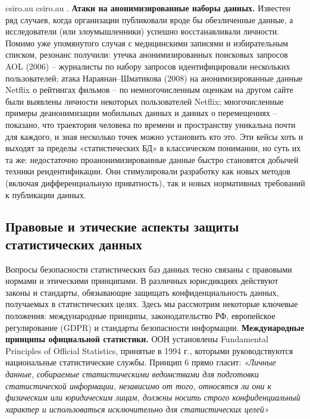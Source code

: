 csiro.au
csiro.au
. \textbf{Атаки на анонимизированные наборы данных.} Известен ряд случаев, когда организации публиковали вроде бы обезличенные данные, а исследователи (или злоумышленники) успешно восстанавливали личности. Помимо уже упомянутого случая с медицинскими записями и избирательным списком, резонанс получили: утечка анонимизированных поисковых запросов AOL (2006) – журналисты по набору запросов идентифицировали нескольких пользователей; атака Нараянан–Шматикова (2008) на анонимизированные данные Netflix о рейтингах фильмов – по немногочисленным оценкам на другом сайте были выявлены личности некоторых пользователей Netflix; многочисленные примеры деанонимизации мобильных данных и данных о перемещениях – показано, что траектория человека по времени и пространству уникальна почти для каждого, и зная несколько точек можно установить кто это. Эти кейсы хоть и выходят за пределы «статистических БД» в классическом понимании, но суть их та же: недостаточно проанонимизированные данные быстро становятся добычей техники реидентификации. Они стимулировали разработку как новых методов (включая дифференциальную приватность), так и новых нормативных требований к публикации данных. \subsection{Правовые и этические аспекты защиты статистических данных}
Вопросы безопасности статистических баз данных тесно связаны с правовыми нормами и этическими принципами. В различных юрисдикциях действуют законы и стандарты, обязывающие защищать конфиденциальность данных, получаемых в статистических целях. Здесь мы рассмотрим некоторые ключевые положения: международные принципы, законодательство РФ, европейское регулирование (GDPR) и стандарты безопасности информации. \textbf{Международные принципы официальной статистики.} ООН установлены Fundamental Principles of Official Statistics, принятые в 1994 г., которыми руководствуются национальные статистические службы. Принцип 6 прямо гласит: \textit{«Личные данные, собираемые статистическими ведомствами для подготовки статистической информации, независимо от того, относятся ли они к физическим или юридическим лицам, должны носить строго конфиденциальный характер и использоваться исключительно для статистических целей»}
\autocite{unstats-un-org}
